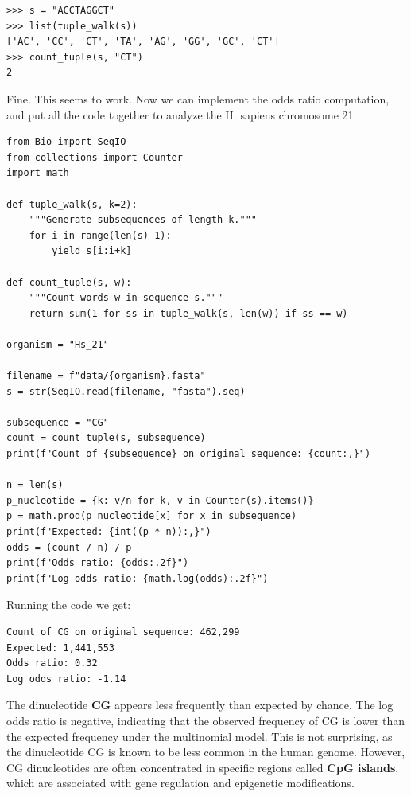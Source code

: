 \vspace*{3mm}
\begin{lstlisting}
>>> s = "ACCTAGGCT"
>>> list(tuple_walk(s))
['AC', 'CC', 'CT', 'TA', 'AG', 'GG', 'GC', 'CT']
>>> count_tuple(s, "CT")
2
\end{lstlisting}

Fine. This seems to work. Now we can implement the odds ratio computation, and put all the code together to analyze the H. sapiens chromosome 21:

\vspace*{3mm}
\begin{lstlisting}
from Bio import SeqIO
from collections import Counter
import math

def tuple_walk(s, k=2):
    """Generate subsequences of length k."""
    for i in range(len(s)-1):
        yield s[i:i+k]

def count_tuple(s, w):
    """Count words w in sequence s."""
    return sum(1 for ss in tuple_walk(s, len(w)) if ss == w)

organism = "Hs_21"

filename = f"data/{organism}.fasta"
s = str(SeqIO.read(filename, "fasta").seq)

subsequence = "CG"
count = count_tuple(s, subsequence)
print(f"Count of {subsequence} on original sequence: {count:,}")

n = len(s)
p_nucleotide = {k: v/n for k, v in Counter(s).items()}
p = math.prod(p_nucleotide[x] for x in subsequence)
print(f"Expected: {int((p * n)):,}")
odds = (count / n) / p
print(f"Odds ratio: {odds:.2f}")
print(f"Log odds ratio: {math.log(odds):.2f}")
\end{lstlisting}

Running the code we get:

\vspace*{3mm}
\begin{lstlisting}
Count of CG on original sequence: 462,299
Expected: 1,441,553
Odds ratio: 0.32
Log odds ratio: -1.14
\end{lstlisting}

The dinucleotide \textbf{CG} appears less frequently than expected by chance. The log odds ratio is negative, indicating that the observed frequency of CG is lower than the expected frequency under the multinomial model. This is not surprising, as the dinucleotide CG is known to be less common in the human genome. However, CG dinucleotides are often concentrated in specific regions called \textbf{CpG islands}, which are associated with gene regulation and epigenetic modifications.

